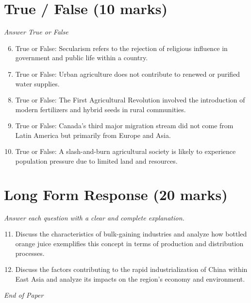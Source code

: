 \documentclass[12pt]{article}
\begin{document}
\section*{True / False (10 marks)}
\textit{Answer True or False}
\begin{enumerate}[label=\arabic*.]
\setcounter{enumi}{5}
\item True or False: Secularism refers to the rejection of religious influence in government and public life within a country.
\item True or False: Urban agriculture does not contribute to renewed or purified water supplies.
\item True or False: The First Agricultural Revolution involved the introduction of modern fertilizers and hybrid seeds in rural communities.
\item True or False: Canada's third major migration stream did not come from Latin America but primarily from Europe and Asia.
\item True or False: A slash-and-burn agricultural society is likely to experience population pressure due to limited land and resources.
\end{enumerate}

\section*{Long Form Response (20 marks)}
\textit{Answer each question with a clear and complete explanation.}
\begin{enumerate}[label=\arabic*.]
\setcounter{enumi}{10}
\item Discuss the characteristics of bulk-gaining industries and analyze how bottled orange juice exemplifies this concept in terms of production and distribution processes.
\item Discuss the factors contributing to the rapid industrialization of China within East Asia and analyze its impacts on the region's economy and environment.
\end{enumerate}

\vfill
\noindent\textit{End of Paper}
\end{document}
